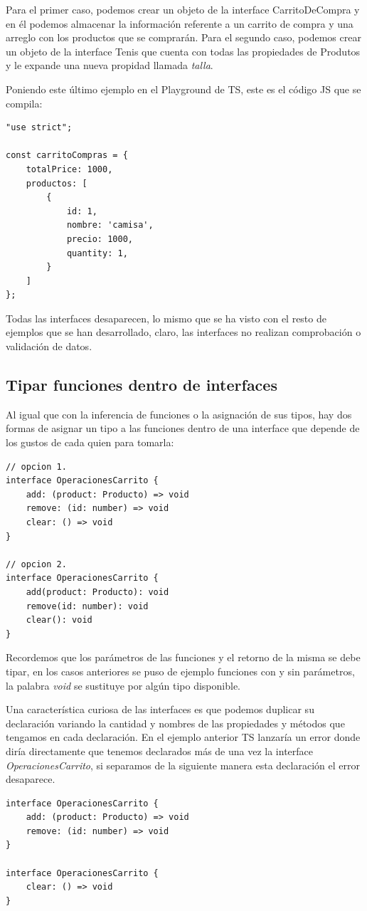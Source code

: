 Para el primer caso, podemos crear un objeto de la interface CarritoDeCompra y en él podemos almacenar la información referente a un carrito de compra y una arreglo con los productos que se comprarán. Para el segundo caso, podemos crear un objeto de la interface Tenis que cuenta con todas las propiedades de Produtos y le expande una nueva propidad llamada \textit{talla}.

Poniendo este último ejemplo en el Playground de TS, este es el código JS que se compila:
\begin{lstlisting}
"use strict";

const carritoCompras = {
    totalPrice: 1000,
    productos: [
        {
            id: 1,
            nombre: 'camisa',
            precio: 1000,
            quantity: 1,
        }
    ]
};
\end{lstlisting}

Todas las interfaces desaparecen, lo mismo que se ha visto con el resto de ejemplos que se han desarrollado, claro, las interfaces no realizan comprobación o validación de datos.


\subsection{Tipar funciones dentro de interfaces}

Al igual que con la inferencia de funciones o la asignación de sus tipos, hay dos formas de asignar un tipo a las funciones dentro de una interface que depende de los gustos de cada quien para tomarla:
\begin{lstlisting}
// opcion 1.
interface OperacionesCarrito {
    add: (product: Producto) => void
    remove: (id: number) => void
    clear: () => void
}

// opcion 2.
interface OperacionesCarrito {
    add(product: Producto): void
    remove(id: number): void
    clear(): void
}
\end{lstlisting}

Recordemos que los parámetros de las funciones y el retorno de la misma se debe tipar, en los casos anteriores se puso de ejemplo funciones con y sin parámetros, la palabra \textit{void} se sustituye por algún tipo disponible.

Una característica curiosa de las interfaces es que podemos duplicar su declaración variando la cantidad y nombres de las propiedades y métodos que tengamos en cada declaración. En el ejemplo anterior TS lanzaría un error donde diría directamente que tenemos declarados más de una vez la interface \textit{OperacionesCarrito}, si separamos de la siguiente manera esta declaración el error desaparece.
\begin{lstlisting}
interface OperacionesCarrito {
    add: (product: Producto) => void
    remove: (id: number) => void
}

interface OperacionesCarrito {
    clear: () => void
}
\end{lstlisting}

